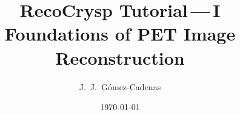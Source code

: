 \documentclass[11pt,a4paper]{article}
\title{RecoCrysp Tutorial\,---\,I\\[2pt]
       \large Foundations of PET Image Reconstruction}
\author{J.~J.~G\'omez-Cadenas}
\date{\today}
\begin{document}
\maketitle

\begin{abstract}

\end{abstract}

\tableofcontents
\clearpage














\appendix



\end{document}
